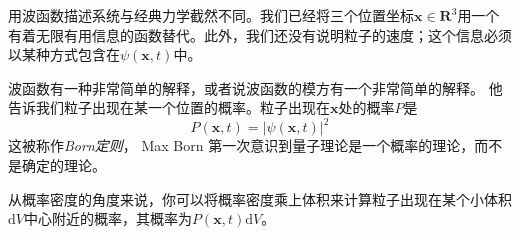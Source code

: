 用波函数描述系统与经典力学截然不同。我们已经将三个位置坐标$\mathbf{x}\in \mathbf{R}^3$用一个有着无限有用信息的函数替代。此外，我们还没有说明粒子的速度；这个信息必须以某种方式包含在$\psi(\mathbf{x},t)$中。\par
波函数有一种非常简单的解释，或者说波函数的模方有一个非常简单的解释。 他告诉我们粒子出现在某一个位置的概率。粒子出现在$\mathbf{x}$处的概率$P$是
\[
P(\mathbf{x},t) =|\psi(\mathbf{x},t)|^2
\]
这被称作\textit{Born定则}， Max Born 第一次意识到量子理论是一个概率的理论，而不是确定的理论。\par
从概率密度的角度来说，你可以将概率密度乘上体积来计算粒子出现在某个小体积$\mathrm{d}V$中心附近的概率，其概率为$P(\mathbf{x},t)\mathrm{d}V$。\par
